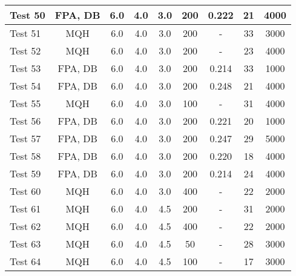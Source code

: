 \begin{table}[!h]
\begin{center}
\begin{tabular}{|l|c|c|c|c|c|c|c|c|}
Test 50    &  FPA, DB           &  6.0       &  4.0       &  3.0       &  200            &  0.222          &  21                &  4000            \\ \hline
Test 51    &  MQH               &  6.0       &  4.0       &  3.0       &  200            &  -              &  33                &  3000            \\ \hline
Test 52    &  MQH               &  6.0       &  4.0       &  3.0       &  200            &  -              &  23                &  4000            \\ \hline
Test 53    &  FPA, DB           &  6.0       &  4.0       &  3.0       &  200            &  0.214          &  33                &  1000            \\ \hline
Test 54    &  FPA, DB           &  6.0       &  4.0       &  3.0       &  200            &  0.248          &  21                &  4000            \\ \hline
Test 55    &  MQH               &  6.0       &  4.0       &  3.0       &  100            &  -              &  31                &  4000            \\ \hline
Test 56    &  FPA, DB           &  6.0       &  4.0       &  3.0       &  200            &  0.221          &  20                &  1000            \\ \hline
Test 57    &  FPA, DB           &  6.0       &  4.0       &  3.0       &  200            &  0.247          &  29                &  5000            \\ \hline
Test 58    &  FPA, DB           &  6.0       &  4.0       &  3.0       &  200            &  0.220          &  18                &  4000            \\ \hline
Test 59    &  FPA, DB           &  6.0       &  4.0       &  3.0       &  200            &  0.214          &  24                &  4000            \\ \hline
Test 60    &  MQH               &  6.0       &  4.0       &  3.0       &  400            &  -              &  22                &  2000            \\ \hline
Test 61    &  MQH               &  6.0       &  4.0       &  4.5       &  200            &  -              &  31                &  2000            \\ \hline
Test 62    &  MQH               &  6.0       &  4.0       &  4.5       &  400            &  -              &  22                &  2000            \\ \hline
Test 63    &  MQH               &  6.0       &  4.0       &  4.5       &  50             &  -              &  28                &  3000            \\ \hline
Test 64    &  MQH               &  6.0       &  4.0       &  4.5       &  100            &  -              &  17                &  3000            \\ \hline
\end{tabular}
\end{center}
\end{table}


